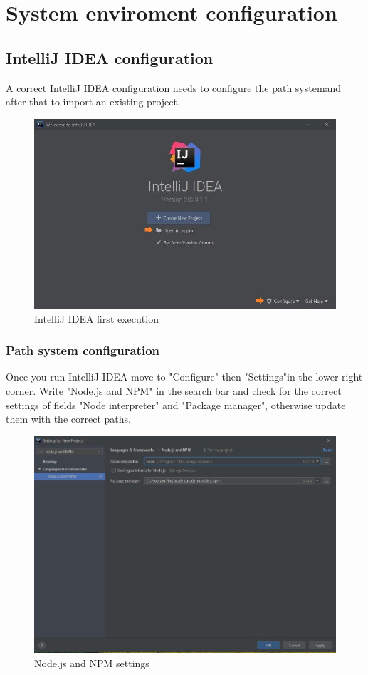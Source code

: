 \section{System enviroment configuration}
	\subsection{IntelliJ IDEA configuration}
A correct IntelliJ IDEA configuration needs to configure the path system\glo and after that to import an existing project.
	
	\begin{figure}[H]
		\centering
		\includegraphics[scale=0.70]{../Developer_manual/img/intellijidea_main.jpg}
		\caption{IntelliJ IDEA first execution}
	\end{figure}	

	

	\subsubsection{Path system configuration}
Once you run IntelliJ IDEA move to "Configure" then "Settings"in the lower-right corner. Write "Node.js and NPM" in the search bar and check for the correct settings of fields "Node interpreter" and "Package manager", otherwise update them with the correct paths. 

\begin{figure}[H]
		\centering
		\includegraphics[scale=0.60]{../Developer_manual/img/nodejs_and_npm.jpg}
		\caption{Node.js and NPM settings}
	\end{figure}	

